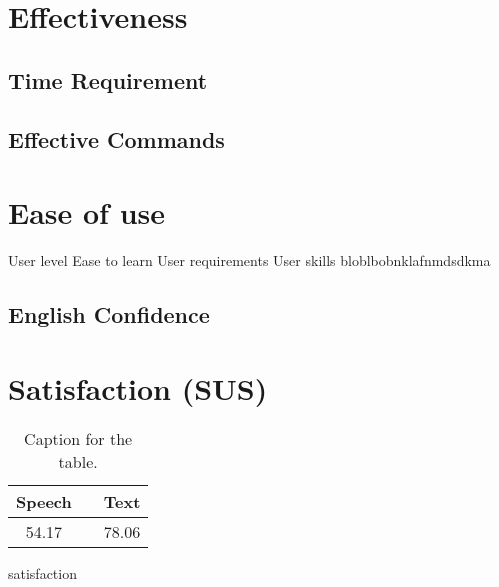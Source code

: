 \section{Effectiveness} 
\subsection{Time Requirement}
\subsection{Effective Commands}

\section{Ease of use}
User level
Ease to learn
User requirements
User skills
bloblbobnklafnmdsdkma
\subsection{English Confidence}

\section{Satisfaction (SUS)}

\begin{table}[h!]
  \centering
  \label{tab:table1}
  \begin{tabular}{ccc}
    \toprule
    Speech &   & Text\\
    \midrule
    54.17 &   & 78.06\\
    \bottomrule
  \end{tabular}
  \caption{Caption for the table.}
\end{table}

satisfaction